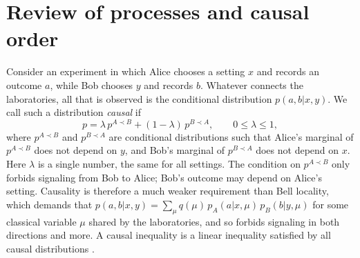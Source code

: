 \documentclass[aps,prl,reprint,superscriptaddress,nofootinbib,longbibliography,raggedbottom]{revtex4-2}
\begin{document}
\medskip
\section{Review of processes and causal order}
Consider an experiment in which Alice chooses a setting $x$ and records an
outcome $a$, while Bob chooses $y$ and records $b$. Whatever connects the
laboratories, all that is observed is the conditional distribution
$p(a,b|x,y)$. We call such a distribution \emph{causal} if
\begin{equation}\label{causal}
p=\lambda\,p^{A\prec B}+(1-\lambda)\,p^{B\prec A},\qquad 0\leq\lambda\leq1,
\end{equation}
where $p^{A\prec B}$ and $p^{B\prec A}$ are conditional distributions such
that Alice's marginal of $p^{A\prec B}$ does not depend on $y$, and Bob's
marginal of $p^{B\prec A}$ does not depend on $x$. Here $\lambda$ is a
single number, the same for all settings. The condition on $p^{A\prec B}$
only forbids signaling from Bob to Alice; Bob's outcome may depend on
Alice's setting. Causality is therefore a much weaker requirement than Bell
locality, which demands that
$p(a,b|x,y)=\sum_\mu q(\mu)\,p_A(a|x,\mu)\,p_B(b|y,\mu)$ for some classical
variable $\mu$ shared by the laboratories, and so forbids signaling in both
directions and more. A causal inequality is a linear inequality
satisfied by all causal distributions \cite{OCB,Branciard}.
\end{document}
